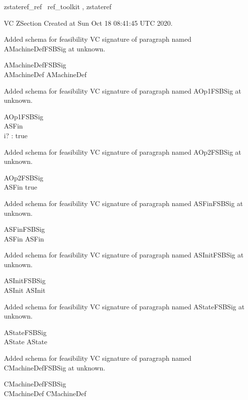 \documentclass{article}
\begin{document}

\begin{zsection}	 \SECTION zstateref\_ref \parents~ref\_toolkit , zstateref
\end{zsection}

VC ZSection Created at Sun Oct 18 08:41:45 UTC 2020.


Added schema for feasibility VC signature of paragraph named AMachineDefFSBSig at unknown.
\begin{schema}{AMachineDefFSBSig}
\\
 AMachineDef 
\where
 AMachineDef
\end{schema}


Added schema for feasibility VC signature of paragraph named AOp1FSBSig at unknown.
\begin{schema}{AOp1FSBSig}
\\
 ASFin \\
 i? : \nat 
\where
 true
\end{schema}


Added schema for feasibility VC signature of paragraph named AOp2FSBSig at unknown.
\begin{schema}{AOp2FSBSig}
\\
 ASFin 
\where
 true
\end{schema}


Added schema for feasibility VC signature of paragraph named ASFinFSBSig at unknown.
\begin{schema}{ASFinFSBSig}
\\
 ASFin 
\where
 ASFin
\end{schema}


Added schema for feasibility VC signature of paragraph named ASInitFSBSig at unknown.
\begin{schema}{ASInitFSBSig}
\\
 ASInit 
\where
 ASInit
\end{schema}


Added schema for feasibility VC signature of paragraph named AStateFSBSig at unknown.
\begin{schema}{AStateFSBSig}
\\
 AState 
\where
 AState
\end{schema}


Added schema for feasibility VC signature of paragraph named CMachineDefFSBSig at unknown.
\begin{schema}{CMachineDefFSBSig}
\\
 CMachineDef 
\where
 CMachineDef
\end{schema}
\end{document}
